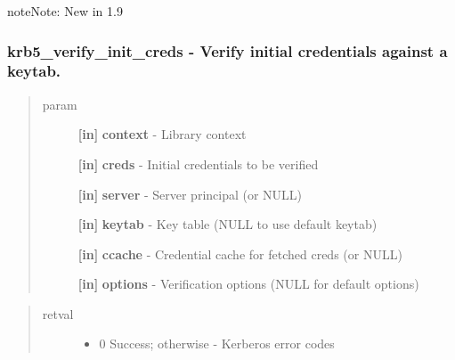 \documentclass[letterpaper,10pt,english]{sphinxmanual}
\begin{document}
\begin{notice}{note}{Note:}
New in 1.9
\end{notice}


\subsubsection{krb5\_verify\_init\_creds -  Verify initial credentials against a keytab.}
\label{appdev/refs/api/krb5_verify_init_creds:krb5-verify-init-creds-verify-initial-credentials-against-a-keytab}\label{appdev/refs/api/krb5_verify_init_creds::doc}

\begin{fulllineitems}
\label{appdev/refs/api/krb5_verify_init_creds:krb5_verify_init_creds}
\end{fulllineitems}

\begin{quote}\begin{description}
\item[{param}] \leavevmode
\textbf{{[}in{]}} \textbf{context} - Library context

\textbf{{[}in{]}} \textbf{creds} - Initial credentials to be verified

\textbf{{[}in{]}} \textbf{server} - Server principal (or NULL)

\textbf{{[}in{]}} \textbf{keytab} - Key table (NULL to use default keytab)

\textbf{{[}in{]}} \textbf{ccache} - Credential cache for fetched creds (or NULL)

\textbf{{[}in{]}} \textbf{options} - Verification options (NULL for default options)

\end{description}\end{quote}
\begin{quote}\begin{description}
\item[{retval}] \leavevmode\begin{itemize}
\item {} 
0   Success; otherwise - Kerberos error codes

\end{itemize}

\end{description}\end{quote}
\end{document}
